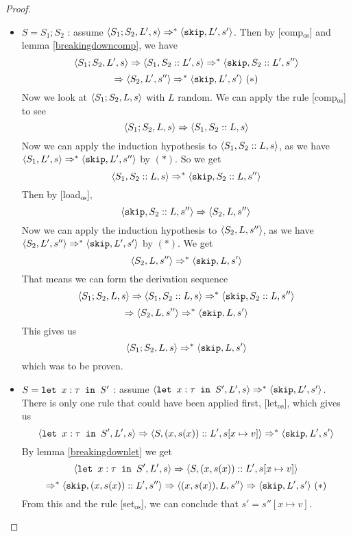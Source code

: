 \begin{proof}
\begin{itemize}[noitemsep]
    \item $S = S_1; S_2$ : assume $\langle  S_1;S_2, L',  s \rangle \Rightarrow ^{*} \langle \texttt{skip}, L', s' \rangle$. Then by [comp$_{\textrm{os}}$] and lemma \ref{breakingdowncomp}, we have $$\langle S_1;S_2, L', s \rangle \Rightarrow \langle S_1, S_2::L', s \rangle \Rightarrow ^{*} \langle \texttt{skip}, S_2::L', s'' \rangle$$ $$\Rightarrow \langle S_2, L', s'' \rangle \Rightarrow ^{*} \langle \texttt{skip}, L', s' \rangle ~( * )$$
    Now we look at $\langle S_1;S_2, L, s \rangle$ with $L$ random. We can apply the rule [comp$_{\textrm{os}}$] to see $$\langle S_1;S_2, L, s \rangle \Rightarrow \langle S_1, S_2::L, s \rangle$$ Now we can apply the induction hypothesis to $\langle S_1, S_2::L, s \rangle$, as we have $\langle S_1, L', s \rangle \Rightarrow ^{*} \langle \texttt{skip}, L', s'' \rangle$ by $( * )$. So we get 
    $$\langle S_1, S_2::L, s \rangle \Rightarrow ^{*} \langle \texttt{skip}, S_2::L, s'' \rangle$$
    Then by [load$_{\textrm{os}}$], $$\langle \texttt{skip}, S_2::L, s'' \rangle \Rightarrow \langle S_2, L, s'' \rangle$$
    Now we can apply the induction hypothesis to $\langle S_2, L, s'' \rangle$, as we have $\langle S_2, L', s'' \rangle \Rightarrow ^{*} \langle \texttt{skip}, L', s' \rangle$ by $( * )$. We get 
    $$\langle S_2, L, s'' \rangle \Rightarrow ^{*} \langle \texttt{skip}, L, s' \rangle$$
    That means we can form the derivation sequence $$\langle S_1;S_2, L, s \rangle \Rightarrow \langle S_1, S_2::L, s \rangle \Rightarrow ^{*} \langle \texttt{skip}, S_2::L, s'' \rangle $$ $$ \Rightarrow \langle S_2, L, s'' \rangle \Rightarrow ^{*} \langle \texttt{skip}, L, s' \rangle$$
    This gives us 
    $$\langle S_1;S_2, L, s \rangle \Rightarrow ^{*} \langle \texttt{skip}, L, s' \rangle$$
    which was to be proven. 
        
    \item $S = \texttt{let }x : \tau \texttt{ in } S'$ : assume $\langle \texttt{let }x : \tau \texttt{ in } S', L', s \rangle \Rightarrow ^{*} \langle \texttt{skip}, L', s' \rangle$. There is only one rule that could have been applied first, [let$_{\textrm{os}}$], which gives us 
    $$\langle \texttt{let }x : \tau \texttt{ in } S', L', s \rangle \Rightarrow \langle S, (x,s(x))::L', s[x\mapsto v] \rangle \Rightarrow ^{*} \langle \texttt{skip}, L', s' \rangle$$
    By lemma \ref{breakingdownlet} we get 
    $$\langle \texttt{let }x : \tau \texttt{ in } S', L', s \rangle \Rightarrow \langle S, (x,s(x))::L', s[x\mapsto v] \rangle$$ $$\Rightarrow ^{*} \langle \texttt{skip}, (x,s(x))::L', s'' \rangle \Rightarrow \langle (x,s(x)), L, s'' \rangle \Rightarrow \langle \texttt{skip}, L', s' \rangle ~ ( * )$$
    From this and the rule [set$_{\textrm{os}}$], we can conclude that $s' = s''[x\mapsto v]$.
    

\end{itemize}
\end{proof}

